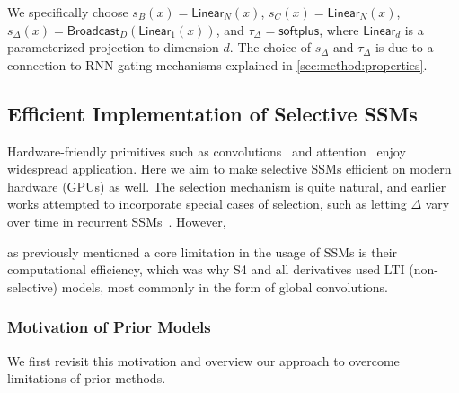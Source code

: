 We specifically choose $s_B(x) = \mathsf{Linear}_N(x)$, $s_C(x) = \mathsf{Linear}_N(x)$,
$s_\Delta(x) = \mathsf{Broadcast}_D(\mathsf{Linear}_1(x))$, and $\tau_\Delta = \mathsf{softplus}$,
where $\mathsf{Linear}_d$ is a parameterized projection to dimension $d$. The choice of $s_\Delta$ and $\tau_\Delta$ is due to a connection to RNN gating mechanisms explained in \ref{sec:method:properties}.

\subsection{Efficient Implementation of Selective SSMs}
\label{sec:method:scan}

Hardware-friendly primitives such as convolutions~\citep{krizhevsky2012imagenet} and attention~\citep{bahdanau2015neural,vaswani2017attention} enjoy widespread application. Here we aim to make selective SSMs efficient on modern hardware (GPUs) as well. The selection mechanism is quite natural, and earlier works attempted to incorporate special cases of selection, such as letting $\Delta$ vary over time in recurrent SSMs~\citep{gu2020hippo}.
However,

as previously mentioned a core limitation in the usage of SSMs is their computational efficiency, which was why S4 and all derivatives used LTI (non-selective) models, most commonly in the form of global convolutions.

\subsubsection{Motivation of Prior Models}

We first revisit this motivation and overview our approach to overcome limitations of prior methods.

